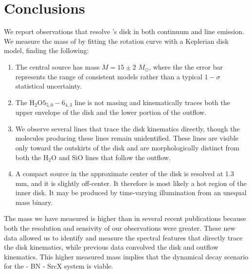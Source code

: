 \documentclass[twocolumn]{aastex61}
\newcommand{\msun}{\ensuremath{M_{\odot}}\xspace}			%
\newcommand{\water}{H$_{2}$O\xspace}		%
\newcommand{\sourcex}{SrcX\xspace}
\begin{document}
\section{Conclusions}
\label{sec:conclusions}
We report observations that resolve \sourcei's disk in both continuum
and line emission.  We measure the mass of \sourcei by fitting the 
rotation curve with a Keplerian disk model, finding the following:

\begin{enumerate}
    \item The central source has mass $M=15\pm2$ \msun, where the the error
        bar represents the range of consistent models rather than a typical
        $1-\sigma$ statistical uncertainty.
    \item The \water $5_{5,0}-6_{4,3}$ line is not masing and kinematically
        traces both the upper envelope of the disk and the lower portion of
        the outflow.
    \item We observe several lines that trace the disk kinematics
        directly, though the molecules producing these lines remain
        unidentified.  These lines are visible only toward the outskirts of the
        disk and are morphologically distinct from both the \water and SiO
        lines that follow the outflow.
    \item A compact source in the approximate center of the disk
        is resolved at 1.3 mm, and it is slightly off-center.  It therefore is
        most likely a hot region of the inner disk.  It may be produced
        by time-varying illumination from an unequal mass binary.
\end{enumerate}

The mass we have measured is higher than in several recent publications because
both the resolution and sensivity of our observations were greater.  These new
data allowed us to identify and measure the spectral features that directly
trace the disk kinematics, while previous data convolved the disk and outflow
kinematics.  This higher measured mass implies that the dynamical decay
scenario for the \sourcei - BN - \sourcex system is viable.

\end{document}
